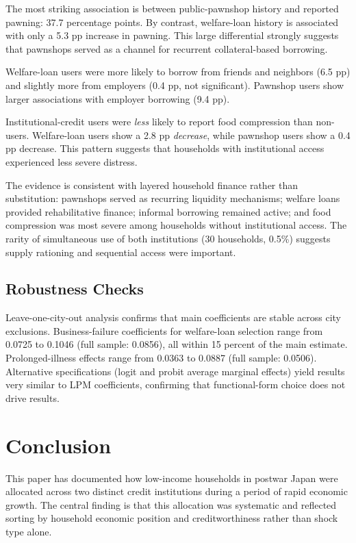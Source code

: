\documentclass[12pt]{article}
\begin{document}
The most striking association is between public-pawnshop history and reported pawning: 37.7 percentage points. By contrast, welfare-loan history is associated with only a 5.3 pp increase in pawning. This large differential strongly suggests that pawnshops served as a channel for recurrent collateral-based borrowing.

Welfare-loan users were more likely to borrow from friends and neighbors (6.5 pp) and slightly more from employers (0.4 pp, not significant). Pawnshop users show larger associations with employer borrowing (9.4 pp).

Institutional-credit users were \textit{less} likely to report food compression than non-users. Welfare-loan users show a 2.8 pp \textit{decrease}, while pawnshop users show a 0.4 pp decrease. This pattern suggests that households with institutional access experienced less severe distress.

The evidence is consistent with layered household finance rather than substitution: pawnshops served as recurring liquidity mechanisms; welfare loans provided rehabilitative finance; informal borrowing remained active; and food compression was most severe among households without institutional access. The rarity of simultaneous use of both institutions (30 households, 0.5\%) suggests supply rationing and sequential access were important.

\subsection{Robustness Checks}

Leave-one-city-out analysis confirms that main coefficients are stable across city exclusions. Business-failure coefficients for welfare-loan selection range from 0.0725 to 0.1046 (full sample: 0.0856), all within 15 percent of the main estimate. Prolonged-illness effects range from 0.0363 to 0.0887 (full sample: 0.0506). Alternative specifications (logit and probit average marginal effects) yield results very similar to LPM coefficients, confirming that functional-form choice does not drive results.

\newpage
\section{Conclusion}

This paper has documented how low-income households in postwar Japan were allocated across two distinct credit institutions during a period of rapid economic growth. The central finding is that this allocation was systematic and reflected sorting by household economic position and creditworthiness rather than shock type alone.
\end{document}
